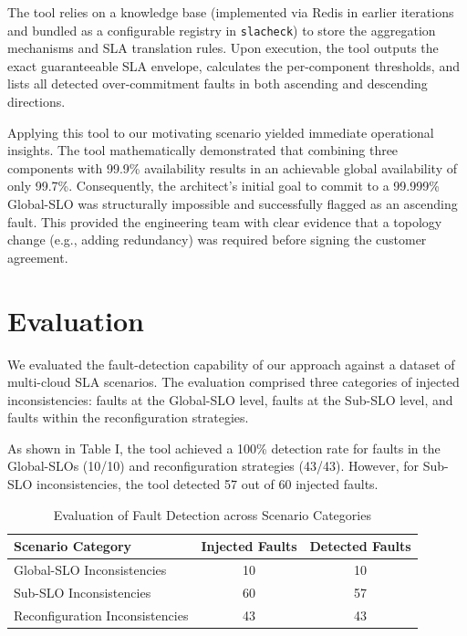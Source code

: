 \documentclass[conference]{IEEEtran}
\begin{document}
The tool relies on a knowledge base (implemented via Redis in earlier iterations and bundled as a configurable registry in \texttt{slacheck}) to store the aggregation mechanisms and SLA translation rules. Upon execution, the tool outputs the exact guaranteeable SLA envelope, calculates the per-component thresholds, and lists all detected over-commitment faults in both ascending and descending directions. 

Applying this tool to our motivating scenario yielded immediate operational insights. The tool mathematically demonstrated that combining three components with 99.9\% availability results in an achievable global availability of only 99.7\%. Consequently, the architect's initial goal to commit to a 99.999\% Global-SLO was structurally impossible and successfully flagged as an ascending fault. This provided the engineering team with clear evidence that a topology change (e.g., adding redundancy) was required before signing the customer agreement.

\section{Evaluation}\label{sec:eval}

We evaluated the fault-detection capability of our approach against a dataset of multi-cloud SLA scenarios. The evaluation comprised three categories of injected inconsistencies: faults at the Global-SLO level, faults at the Sub-SLO level, and faults within the reconfiguration strategies.

As shown in Table I, the tool achieved a 100\% detection rate for faults in the Global-SLOs (10/10) and reconfiguration strategies (43/43). However, for Sub-SLO inconsistencies, the tool detected 57 out of 60 injected faults. 

\begin{table}[htbp]
\caption{Evaluation of Fault Detection across Scenario Categories}
\begin{center}
\begin{tabular}{|l|c|c|}
\hline
\textbf{Scenario Category} & \textbf{Injected Faults} & \textbf{Detected Faults} \\
\hline
Global-SLO Inconsistencies & 10 & 10 \\
Sub-SLO Inconsistencies & 60 & 57 \\
Reconfiguration Inconsistencies & 43 & 43 \\
\hline
\end{tabular}
\label{tab:eval}
\end{center}
\end{table}
\end{document}

